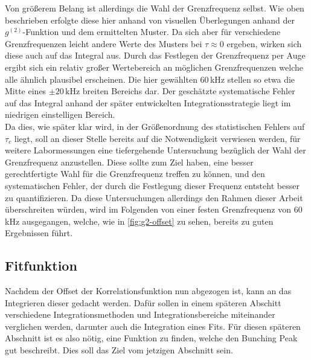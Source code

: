 Von größerem Belang ist allerdings die Wahl der Grenzfrequenz selbst. 
Wie oben beschrieben erfolgte diese hier anhand von visuellen Überlegungen anhand der $g^{(2)}$-Funktion und dem ermittelten Muster. 
Da sich aber für verschiedene Grenzfrequenzen leicht andere Werte des Musters bei $\tau\approx 0$ ergeben, wirken sich diese auch auf das Integral aus. 
Durch das Festlegen der Grenzfrequenz per Auge ergibt sich ein relativ großer Wertebereich an möglichen Grenzfrequenzen welche alle ähnlich plausibel erscheinen. 
Die hier gewählten 60\,kHz stellen so etwa die Mitte eines $\pm20\,\mathrm{kHz}$ breiten Bereichs dar. 
Der geschätzte systematische Fehler auf das Integral anhand der später entwickelten Integrationsstrategie liegt im niedrigen einstelligen Bereich. \\

Da dies, wie später klar wird, in der Größenordnung des statistischen Fehlers auf $\tau_c$ liegt, soll an dieser Stelle bereits auf die Notwendigkeit verwiesen werden, für weitere Labormessungen eine tiefergehende Untersuchung bezüglich der Wahl der Grenzfrequenz anzustellen. 
Diese sollte zum Ziel haben, eine besser gerechtfertigte Wahl für die Grenzfrequenz treffen zu können, und den systematischen Fehler, der durch die Festlegung dieser Frequenz entsteht besser zu quantifizieren. 
Da diese Untersuchungen allerdings den Rahmen dieser Arbeit überschreiten würden, wird im Folgenden von einer festen Grenzfrequenz von 60\,kHz ausgegangen, welche, wie in \autoref{fig:g2-offset} zu sehen, bereits zu guten Ergebnissen führt. 

\subsection{Fitfunktion}
\label{ssec:Fitfunktion}    
Nachdem der Offset der Korrelationsfunktion nun abgezogen ist, kann an das Integrieren dieser gedacht werden. 
Dafür sollen in einem späteren Abschitt verschiedene Integrationsmethoden und Integrationsbereiche miteinander verglichen werden, darunter auch die Integration eines Fits. 
Für diesen späteren Abschnitt ist es also nötig, eine Funktion zu finden, welche den Bunching Peak gut beschreibt. 
Dies soll das Ziel vom jetzigen Abschnitt sein. 

